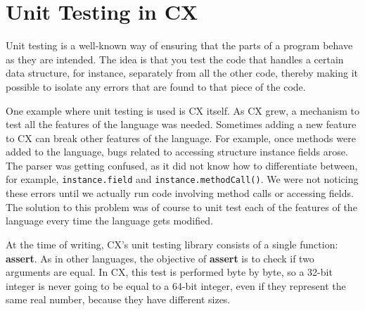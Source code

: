 \documentclass[11pt,fleqn,openany]{book} %
\begin{document}

\chapter{Unit Testing in CX}
\label{chapter:unit-testing-in-cx}


Unit testing is a well-known way of ensuring that the parts of a program behave as they are intended. The idea is that you test the code that handles a certain data structure, for instance, separately from all the other code, thereby making it possible to isolate any errors that are found to that piece of the code.

One example where unit testing is used is CX itself. As CX grew, a mechanism to test all the features of the language was needed. Sometimes adding a new feature to CX can break other features of the language. For example, once methods were added to the language, bugs related to accessing structure instance fields arose. The parser was getting confused, as it did not know how to differentiate between, for example, \lstinline{instance.field} and \lstinline{instance.methodCall()}. We were not noticing these errors until we actually run code involving method calls or accessing fields. The solution to this problem was of course to unit test each of the features of the language every time the language gets modified.

At the time of writing, CX's unit testing library consists of a single function: \textbf{assert}. As in other languages, the objective of \textbf{assert} is to check if two arguments are equal. In CX, this test is performed byte by byte, so a 32-bit integer is never going to be equal to a 64-bit integer, even if they represent the same real number, because they have different sizes.
\end{document}
